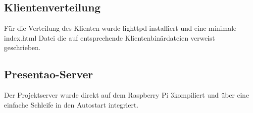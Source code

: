 \subsection{Klientenverteilung}
Für die Verteilung des Klienten wurde lighttpd installiert und eine minimale index.html Datei die auf entsprechende Klientenbinärdateien verweist geschrieben.
\subsection{Presentao-Server}
Der Projektserver wurde direkt auf dem \glqq Raspberry Pi 3\grqq kompiliert und über eine einfache Schleife in den Autostart integriert.